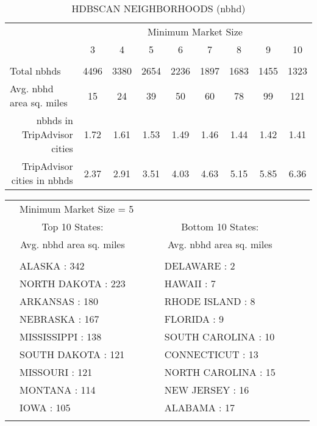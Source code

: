 \begin{table}[!htbp] \centering 
  \caption{HDBSCAN NEIGHBORHOODS (nbhd)} 
  \label{tab:hdbscan2} 
\begin{tabular}{@{\extracolsep{5pt}}llccclccc} 
\\[-1.8ex]\hline 
& \multicolumn{8}{c}{Minimum Market Size} \\ 
\cline{2-9}
& \multicolumn{1}{c}{3} & 4 & 5 & 6 &  \multicolumn{1}{c}{7} &8 & 9 & 10\\ 
\hline \\[-1.8ex] 
Total nbhds & \multicolumn{1}{c}{4496}	& 3380	& 2654	& 2236	&  \multicolumn{1}{c}{1897}	& 1683	& 1455	& 1323\\
Avg. nbhd area sq. miles  & \multicolumn{1}{c}{15}	& 24	& 39	& 50	&  \multicolumn{1}{c}{60}	& 78	& 99	& 121 \\
\multicolumn{1}{r}{nbhds in TripAdvisor cities} & \multicolumn{1}{c}{1.72}	&1.61	&1.53	&1.49	&  \multicolumn{1}{c}{1.46}	&1.44	&1.42	&1.41\\
\multicolumn{1}{r}{TripAdvisor cities in nbhds}  & \multicolumn{1}{c}{2.37}	&2.91	&3.51	&4.03	& \multicolumn{1}{c}{4.63}	&5.15	&5.85	&6.36\\
\hline 
\end{tabular}
\end{table} 
\begin{table}[!htbp] \centering 
\begin{tabular}{@{\extracolsep{5pt}}llccclccc} 
& \multicolumn{6}{l}{Minimum Market Size = 5} \\ 
& \multicolumn{1}{c}{Top 10 States:} & \multicolumn{7}{c}{Bottom 10 States:} \\
& \multicolumn{1}{c}{Avg. nbhd area sq. miles} & & & \multicolumn{3}{c}{Avg. nbhd area sq. miles} \\
\cline{2-9} 
\\[-1.8ex]
 & ALASKA	:	342	&	&	&	&	DELAWARE	:	2	& 	& 	& \\
 & NORTH DAKOTA	:	223	&	&	&	&	HAWAII	:	7	& 	& 	& \\
 & ARKANSAS	:	180	&	&	&	&	RHODE ISLAND	:	8	& 	& 	& \\
 & NEBRASKA	:	167	&	&	&	&	FLORIDA	:	9	& 	& 	& \\
 & MISSISSIPPI	:	138	&	&	&	&	SOUTH CAROLINA	:	10	& 	& 	& \\
 & SOUTH DAKOTA	:	121	&	&	&	&	CONNECTICUT	:	13	& 	& 	& \\
 & MISSOURI	:	121	&	&	&	&	NORTH CAROLINA	:	15	& 	& 	& \\
 & MONTANA	:	114	&	&	&	&	NEW JERSEY	:	16	& 	& 	& \\
 & IOWA	:	105	&	&	&	&	ALABAMA	:	17	& 	& 	& \\
\hline \\[-1.8ex] 
\end{tabular} 
\end{table} 